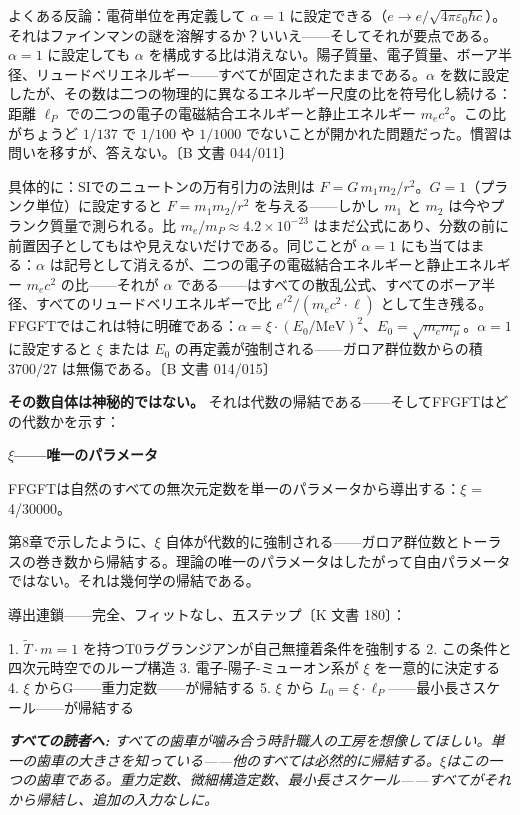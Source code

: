\documentclass[11pt,openany]{book}
\newenvironment{laierspur}{%
  \par\vspace{4pt}%
  \noindent\small\itshape\color{blue!60!black}%
  \textbf{すべての読者へ:}\enspace\ignorespaces}{%
  \par\vspace{4pt}\normalsize\normalfont\normalcolor}
\begin{document}
よくある反論：電荷単位を再定義して $\alpha = 1$ に設定できる（$e \to e/\sqrt{4\pi\varepsilon_0\hbar c}$）。それはファインマンの謎を溶解するか？いいえ——そしてそれが要点である。$\alpha = 1$ に設定しても $\alpha$ を構成する比は消えない。陽子質量、電子質量、ボーア半径、リュードベリエネルギー——すべてが固定されたままである。$\alpha$ を数に設定したが、その数は二つの物理的に異なるエネルギー尺度の比を符号化し続ける：距離 $\ell_P$ での二つの電子の電磁結合エネルギーと静止エネルギー $m_e c^2$。この比がちょうど $1/137$ で $1/100$ や $1/1000$ でないことが開かれた問題だった。慣習は問いを移すが、答えない。〔B 文書 044/011〕

具体的に：SIでのニュートンの万有引力の法則は $F = G\,m_1 m_2/r^2$。$G=1$（プランク単位）に設定すると $F = m_1 m_2/r^2$ を与える——しかし $m_1$ と $m_2$ は今やプランク質量で測られる。比 $m_e/m_P \approx 4.2\times10^{-23}$ はまだ公式にあり、分数の前に前置因子としてもはや見えないだけである。同じことが $\alpha=1$ にも当てはまる：$\alpha$ は記号として消えるが、二つの電子の電磁結合エネルギーと静止エネルギー $m_e c^2$ の比——それが $\alpha$ である——はすべての散乱公式、すべてのボーア半径、すべてのリュードベリエネルギーで比 $e'^2/(m_e c^2 \cdot \ell)$ として生き残る。FFGFTではこれは特に明確である：$\alpha = \xi\cdot(E_0/\mathrm{MeV})^2$、$E_0 = \sqrt{m_e m_\mu}$。$\alpha=1$ に設定すると $\xi$ または $E_0$ の再定義が強制される——ガロア群位数からの積 $3700/27$ は無傷である。〔B 文書 014/015〕

\textbf{その数自体は神秘的ではない。} それは代数の帰結である——そしてFFGFTはどの代数かを示す：

\textbf{$\xi$——唯一のパラメータ}

FFGFTは自然のすべての無次元定数を単一のパラメータから導出する：$\xi$ = 4/30000。

第8章で示したように、$\xi$ 自体が代数的に強制される——ガロア群位数とトーラスの巻き数から帰結する。理論の唯一のパラメータはしたがって自由パラメータではない。それは幾何学の帰結である。

導出連鎖——完全、フィットなし、五ステップ〔K 文書 180〕：

1. $\tilde{T}\cdot m=1$ を持つT0ラグランジアンが自己無撞着条件を強制する
2. この条件と四次元時空でのループ構造
3. 電子-陽子-ミューオン系が $\xi$ を一意的に決定する
4. $\xi$ からG——重力定数——が帰結する
5. $\xi$ から $L_0 = \xi \cdot \ell_P$——最小長さスケール——が帰結する

\begin{laierspur}
すべての歯車が噛み合う時計職人の工房を想像してほしい。単一の歯車の大きさを知っている——他のすべては必然的に帰結する。$\xi$はこの一つの歯車である。重力定数、微細構造定数、最小長さスケール——すべてがそれから帰結し、追加の入力なしに。
\end{laierspur}
\end{document}
